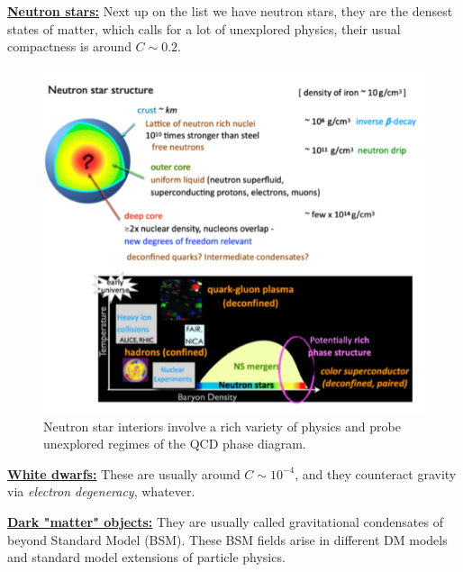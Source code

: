 \documentclass[a4paper, 12pt]{article}
\begin{document}
        \textbf{\underline{Neutron stars:}} Next up on the list we
        have neutron stars, they are the densest states of
        matter, which calls for a lot of unexplored physics, their
        usual compactness is around \( C \sim 0.2 \).  
        \begin{figure}[h!]
        \begin{center}
          \includegraphics[scale=0.5]{Figures/neutron.jpeg}
        \end{center}
        \caption{Neutron star interiors involve a rich variety of
          physics and probe unexplored regimes of the QCD phase
          diagram.}
        \label{fig:neutron}
        \end{figure}
       
       \underline{\textbf{White dwarfs:}} These are usually around
       \( C \sim 10^{-4}  \), and they counteract gravity via
       \textit{electron degeneracy}, whatever. 

       \underline{\textbf{Dark "matter" objects:}} They are
       usually called gravitational condensates of beyond Standard
       Model (BSM). These BSM fields arise in different DM models
       and standard model extensions of particle physics.
  
\end{document}
